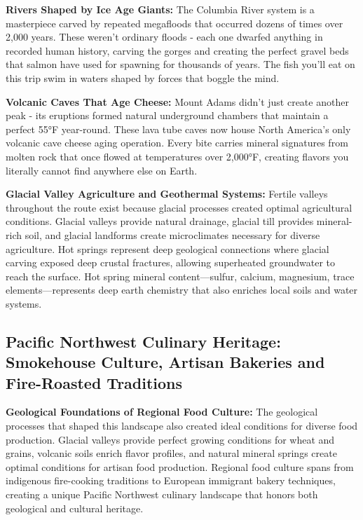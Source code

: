 \documentclass[
  11pt,
  letterpaper,
  DIV=10,
  numbers=noendperiod]{scrartcl}
\begin{document}
\textbf{Rivers Shaped by Ice Age Giants:} The Columbia River system is a
masterpiece carved by repeated megafloods that occurred dozens of times
over 2,000 years. These weren't ordinary floods - each one dwarfed
anything in recorded human history, carving the gorges and creating the
perfect gravel beds that salmon have used for spawning for thousands of
years. The fish you'll eat on this trip swim in waters shaped by forces
that boggle the mind.

\textbf{Volcanic Caves That Age Cheese:} Mount Adams didn't just create
another peak - its eruptions formed natural underground chambers that
maintain a perfect 55°F year-round. These lava tube caves now house
North America's only volcanic cave cheese aging operation. Every bite
carries mineral signatures from molten rock that once flowed at
temperatures over 2,000°F, creating flavors you literally cannot find
anywhere else on Earth.

\textbf{Glacial Valley Agriculture and Geothermal Systems:} Fertile
valleys throughout the route exist because glacial processes created
optimal agricultural conditions. Glacial valleys provide natural
drainage, glacial till provides mineral-rich soil, and glacial landforms
create microclimates necessary for diverse agriculture. Hot springs
represent deep geological connections where glacial carving exposed deep
crustal fractures, allowing superheated groundwater to reach the
surface. Hot spring mineral content---sulfur, calcium, magnesium, trace
elements---represents deep earth chemistry that also enriches local
soils and water systems.

\subsection{Pacific Northwest Culinary Heritage: Smokehouse Culture,
Artisan Bakeries and Fire-Roasted
Traditions}\label{pacific-northwest-culinary-heritage-smokehouse-culture-artisan-bakeries-and-fire-roasted-traditions}

\textbf{Geological Foundations of Regional Food Culture:} The geological
processes that shaped this landscape also created ideal conditions for
diverse food production. Glacial valleys provide perfect growing
conditions for wheat and grains, volcanic soils enrich flavor profiles,
and natural mineral springs create optimal conditions for artisan food
production. Regional food culture spans from indigenous fire-cooking
traditions to European immigrant bakery techniques, creating a unique
Pacific Northwest culinary landscape that honors both geological and
cultural heritage.
\end{document}
